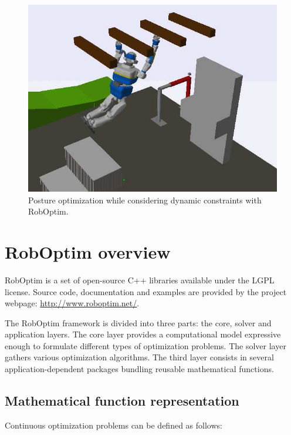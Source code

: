\documentclass[conference,final,a4paper,twocolumn,9pt]{IEEEtran}
\begin{document}
\begin{figure}[ht!]
  \begin{center}
    \includegraphics[width=\linewidth]{agent-067.jpg}
    \caption{Posture optimization while considering dynamic
      constraints with RobOptim.\label{fig:stence-optimization}}
  \end{center}
\end{figure}



\section{RobOptim overview}\label{sec:roboptim}


RobOptim is a set of open-source C++ libraries avail\-able under the
LGPL license. Source code, documenta\-tion and examples are provided by
the project webpage: \mbox{\url{http://www.roboptim.net/}}.


The RobOptim framework is divided into three parts: the core, solver
and application layers. The core layer provides a computational model
expressive enough to formulate different types of optimization
problems. The solver layer gathers various optimization
algorithms. The third layer consists in several application-dependent
packages bundling reusable mathematical functions.


\subsection{Mathematical function representation}


Continuous optimization problems can be defined as follows:
\end{document}
